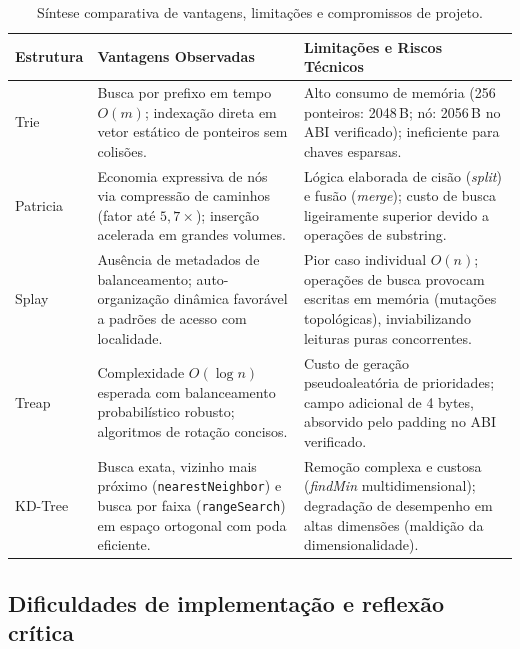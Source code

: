 \documentclass[11pt, a4paper]{article}
\begin{document}
\begin{table}[htbp]
\centering
\scriptsize
\begin{tabular}{@{}l>{\raggedright\arraybackslash}p{6.6cm}>{\raggedright\arraybackslash}p{6.6cm}@{}}
\toprule
\textbf{Estrutura} & \textbf{Vantagens Observadas} & \textbf{Limitações e Riscos Técnicos} \\ \midrule
Trie & Busca por prefixo em tempo $O(m)$; indexação direta em vetor estático de ponteiros sem colisões. & Alto consumo de memória (256 ponteiros: 2048\,B; nó: 2056\,B no ABI verificado); ineficiente para chaves esparsas. \\ \addlinespace
Patricia & Economia expressiva de nós via compressão de caminhos (fator até $5{,}7\times$); inserção acelerada em grandes volumes. & Lógica elaborada de cisão (\textit{split}) e fusão (\textit{merge}); custo de busca ligeiramente superior devido a operações de substring. \\ \addlinespace
Splay & Ausência de metadados de balanceamento; auto-organização dinâmica favorável a padrões de acesso com localidade. & Pior caso individual $O(n)$; operações de busca provocam escritas em memória (mutações topológicas), inviabilizando leituras puras concorrentes. \\ \addlinespace
Treap & Complexidade $O(\log n)$ esperada com balanceamento probabilístico robusto; algoritmos de rotação concisos. & Custo de geração pseudoaleatória de prioridades; campo adicional de 4 bytes, absorvido pelo padding no ABI verificado. \\ \addlinespace
KD-Tree & Busca exata, vizinho mais próximo (\texttt{nearestNeighbor}) e busca por faixa (\texttt{rangeSearch}) em espaço ortogonal com poda eficiente. & Remoção complexa e custosa (\textit{findMin} multidimensional); degradação de desempenho em altas dimensões (maldição da dimensionalidade). \\
\bottomrule
\end{tabular}
\caption{Síntese comparativa de vantagens, limitações e compromissos de projeto.}
\label{tab:tradeoffs}
\end{table}

\subsection{Dificuldades de implementação e reflexão crítica}
\end{document}
